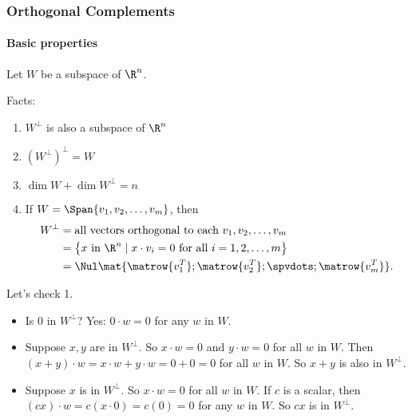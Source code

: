 \begin{frame}
\frametitle{Orthogonal Complements}
\framesubtitle{Basic properties}

Let $W$ be a subspace of $\R^n$.

\medskip
\alert{Facts:}\pause
\begin{enumerate}
\item $W^\perp$ is also a subspace of $\R^n$
\pause
\item $(W^\perp)^\perp = W$
\pause
\item $\dim W + \dim W^\perp = n$
\pause
\item If $W = \Span\{v_1,v_2,\ldots,v_m\}$, then
  \[\begin{split}
    W^\perp &= \text{all vectors orthogonal to each $v_1,v_2,\ldots,v_m$}\\
    &= \bigl\{ \text{$x$ in $\R^n$}\mid
  x\cdot v_i = 0 \text{ for all } i=1,2,\ldots,m \bigr\}\\
    &= \Nul\mat{
    \matrow{v_1^T};
    \matrow{v_2^T};
    \spvdots;
    \matrow{v_m^T}}.
  \end{split}\]

\end{enumerate}

\medskip\small
\begin{webonly}
Let's check \alert{1.}
\begin{itemize}
\item Is $0$ in $W^\perp$?  
  Yes: $0\cdot w = 0$ for any $w$ in $W$.
\item Suppose $x,y$ are in $W^\perp$.
  So $x\cdot w = 0$ and $y\cdot w = 0$ for all $w$ in $W$.
  Then $(x+y)\cdot w = x\cdot w + y\cdot w = 0+0 = 0$ for all $w$ in $W$.
  So $x+y$ is also in $W^\perp$.
\item Suppose $x$ is in $W^\perp$.
  So $x\cdot w = 0$ for all $w$ in $W$.
  If $c$ is a scalar, then $(cx)\cdot w = c(x\cdot 0) = c(0) = 0$ for any $w$ in
  $W$.
  So $cx$ is in $W^\perp$.
\end{itemize}
\end{webonly}

\end{frame}



